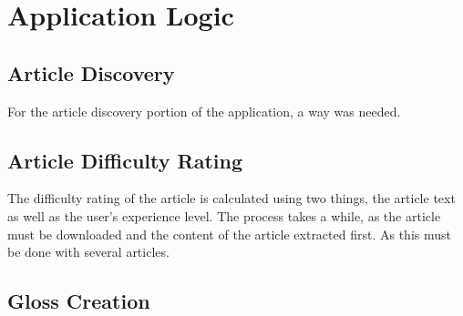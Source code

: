 \chapter{Application Logic}

\section{Article Discovery}

For the article discovery portion of the application, a way was needed.

\section{Article Difficulty Rating}

The difficulty rating of the article is calculated using two things, the article text as well as the user's experience level. The process takes a while, as the article must be downloaded and the content of the article extracted first. As this must be done with several articles. 

\section{Gloss Creation}